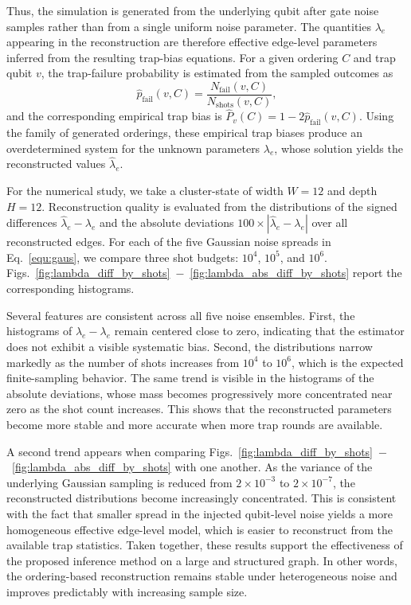 Thus, the simulation is generated from the underlying qubit after gate noise samples rather than from a single uniform noise parameter. The quantities $\lambda_{e}$ appearing in the reconstruction are therefore effective edge-level parameters inferred from the resulting trap-bias equations. For a given ordering $C$ and trap qubit $v$, the trap-failure probability is estimated from the sampled outcomes as
\begin{equation}
	\widehat{p}_{\mathrm{fail}}(v,C)
	=
	\frac{N_{\mathrm{fail}}(v,C)}{N_{\mathrm{shots}}(v,C)},
\end{equation}
and the corresponding empirical trap bias is $\widehat{P}_v(C)=1-2\widehat{p}_{\mathrm{fail}}(v,C)$.
Using the family of generated orderings, these empirical trap biases produce an overdetermined system for the unknown parameters $\lambda_{e}$, whose solution yields the reconstructed values $\widehat{\lambda}_e$.










For the numerical study, we take a cluster-state of width $W=12$ and depth $H=12$.
Reconstruction quality is evaluated from the distributions of the signed differences
$\widehat{\lambda}_e-\lambda_e$ and the absolute deviations
$100\times |\widehat{\lambda}_e-\lambda_e|$ over all reconstructed edges.
For each of the five Gaussian noise spreads in Eq.~\eqref{equ:gaus}, we compare
three shot budgets: $10^4$, $10^5$, and $10^6$. Figs.~\ref{fig:lambda_diff_by_shots}~$-$~\ref{fig:lambda_abs_diff_by_shots} report the corresponding
histograms. 



Several features are consistent across all five noise ensembles. First, the histograms of
$\widehat{\lambda}_e-\lambda_e$ remain centered close to zero, indicating that the estimator
does not exhibit a visible systematic bias. Second, the distributions narrow markedly as the
number of shots increases from $10^4$ to $10^6$, which is the expected finite-sampling
behavior. The same trend is visible in the histograms of the absolute deviations, whose mass
becomes progressively more concentrated near zero as the shot count increases. This shows that
the reconstructed parameters become more stable and more accurate when more trap rounds are
available. 

A second trend appears when comparing Figs.~\ref{fig:lambda_diff_by_shots}~$-$~\ref{fig:lambda_abs_diff_by_shots} with one another. As the variance of the
underlying Gaussian sampling is reduced from $2\times 10^{-3}$ to $2\times 10^{-7}$, the
reconstructed distributions become increasingly concentrated. This is consistent with the fact
that smaller spread in the injected qubit-level noise yields a more homogeneous effective
edge-level model, which is easier to reconstruct from the available trap statistics. Taken
together, these results support the effectiveness of the proposed inference method on a large
and structured graph. In other words, the ordering-based reconstruction remains stable under heterogeneous
noise and improves predictably with increasing sample size.






